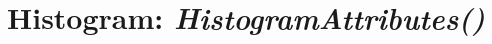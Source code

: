 \documentclass[letterpaper,10pt,english]{sphinxmanual}
\begin{document}
\begin{DUlineblock}{0em}
\item[] 
\end{DUlineblock}

\begin{DUlineblock}{0em}
\item[] 
\end{DUlineblock}


\section{\textbf{Histogram}: \emph{HistogramAttributes()}}
\label{attributes:histogram-histogramattributes}
\begin{DUlineblock}{0em}
\item[] 
\end{DUlineblock}
\end{document}
